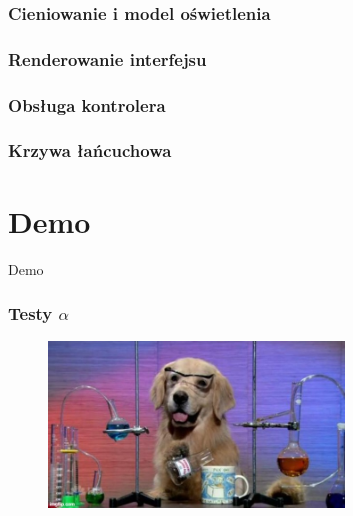 \documentclass[aspectratio=169]{beamer}
\begin{document}
\begin{frame}[allowframebreaks]
	\frametitle{Cieniowanie i model oświetlenia}
	
\end{frame}

\begin{frame}[allowframebreaks]
	\frametitle{Renderowanie interfejsu}
	
\end{frame}

\begin{frame}[allowframebreaks]
	\frametitle{Obsługa kontrolera}
	
\end{frame}

\begin{frame}[allowframebreaks]
	\frametitle{Krzywa łańcuchowa}
	
\end{frame}

\section{Demo}

\begin{frame}
	  \begin{center}
	\Huge Demo
	\end{center}
\end{frame}


\begin{frame}
	\frametitle{Testy $\alpha$} %
	\begin{figure}
		\centering
		\includegraphics[width=0.7\textwidth]{dog.jpg}
	\end{figure}
\end{frame}
\end{document}
